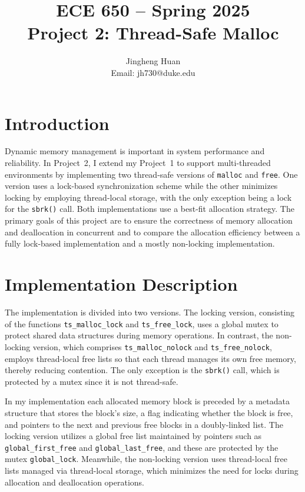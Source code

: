 \documentclass[12pt]{article}
\title{ECE 650 -- Spring 2025\\Project 2: Thread-Safe Malloc}
\author{Jingheng Huan\\Email: jh730@duke.edu}
\begin{document}
\maketitle

\section{Introduction}
Dynamic memory management is important in system performance and reliability. In Project~2, I extend my Project~1 to support multi-threaded environments by implementing two thread-safe versions of \texttt{malloc} and \texttt{free}. One version uses a lock-based synchronization scheme while the other minimizes locking by employing thread-local storage, with the only exception being a lock for the \texttt{sbrk()} call. Both implementations use a best-fit allocation strategy. The primary goals of this project are to ensure the correctness of memory allocation and deallocation in concurrent and to compare the allocation efficiency between a fully lock-based implementation and a mostly non-locking implementation.

\section{Implementation Description}
The implementation is divided into two versions. The locking version, consisting of the functions \texttt{ts\_malloc\_lock} and \texttt{ts\_free\_lock}, uses a global mutex to protect shared data structures during memory operations. In contrast, the non-locking version, which comprises \texttt{ts\_malloc\_nolock} and \texttt{ts\_free\_nolock}, employs thread-local free lists so that each thread manages its own free memory, thereby reducing contention. The only exception is the \texttt{sbrk()} call, which is protected by a mutex since it is not thread-safe.

In my implementation each allocated memory block is preceded by a metadata structure that stores the block's size, a flag indicating whether the block is free, and pointers to the next and previous free blocks in a doubly-linked list. The locking version utilizes a global free list maintained by pointers such as \texttt{global\_first\_free} and \texttt{global\_last\_free}, and these are protected by the mutex \texttt{global\_lock}. Meanwhile, the non-locking version uses thread-local free lists managed via thread-local storage, which minimizes the need for locks during allocation and deallocation operations.
\end{document}
